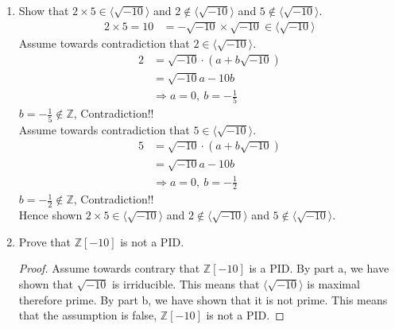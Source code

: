 \documentclass[12pt]{article}
\begin{document}
\begin{enumerate}
\begin{enumerate}
			\item Show that $2 \times 5 \in \langle \sqrt{-10} \rangle$ and $2 \not\in
				\langle \sqrt{-10} \rangle$ and $5 \not\in \langle \sqrt{-10} \rangle$.
				\begin{align*}
					2 \times 5 = 10 &= -\sqrt{-10} \times \sqrt{-10} \in \langle\sqrt{-10}\rangle
				\end{align*}
				Assume towards contradiction that $2 \in \langle\sqrt{-10}\rangle$.
				\begin{align*}
					2 &= \sqrt{-10} \cdot (a + b\sqrt{-10})\\
						&= \sqrt{-10}a - 10b\\
						&\Rightarrow a=0,\ b= -\frac{1}{5}
				\end{align*}
				$b=-\frac{1}{5} \not\in \mathbb{Z}$, Contradiction!!\\
				Assume towards contradiction that $5 \in \langle\sqrt{-10}\rangle$.
				\begin{align*}
					5 &= \sqrt{-10} \cdot (a + b\sqrt{-10})\\
						&= \sqrt{-10}a - 10b\\
						&\Rightarrow a=0,\ b= -\frac{1}{2}
				\end{align*}
				$b=-\frac{1}{2} \not\in \mathbb{Z}$, Contradiction!!\\
				Hence shown $2 \times 5 \in \langle \sqrt{-10} \rangle$ and $2 \not\in
				\langle \sqrt{-10} \rangle$ and $5 \not\in \langle \sqrt{-10} \rangle$.

			\item Prove that $\mathbb{Z}[-10]$ is not a PID.
				\begin{proof} Assume towards contrary that $\mathbb{Z}[-10]$ is a PID.
					By part a, we have shown that $\sqrt{-10}$ is irriducible. This means
					that $\langle \sqrt{-10} \rangle$ is maximal therefore prime. By part
					b, we have shown that it is not prime. This means that the assumption
					is false, $\mathbb{Z}[-10]$ is not a PID.
				\end{proof}
		\end{enumerate}


\end{enumerate}
\end{document}
